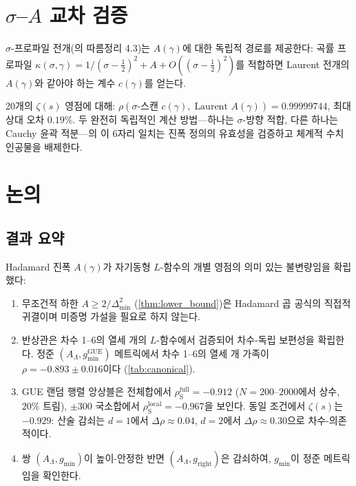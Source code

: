 \documentclass[11pt,a4paper]{article}
\theoremstyle{plain}
\theoremstyle{definition}
\DeclareMathOperator{\GUE}{GUE}
\newcommand{\La}{\Lambda}
\begin{document}
\section{$\sigma$--$A$ 교차 검증}
\label{sec:crosscheck}

$\sigma$-프로파일 전개(\cite{paper2}의 따름정리 4.3)는
$A(\gamma)$에 대한 독립적 경로를 제공한다:
곡률 프로파일 $\kappa(\sigma, \gamma) = 1/(\sigma - \tfrac{1}{2})^2 + A + O((\sigma-\tfrac{1}{2})^2)$를
적합하면 Laurent 전개의 $A(\gamma)$와 같아야 하는 계수 $c(\gamma)$를 얻는다.

20개의 $\zeta(s)$ 영점에 대해:
$\rho(\text{$\sigma$-스캔 } c(\gamma),\; \text{Laurent } A(\gamma))
= 0.99999744$,
최대 상대 오차 $0.19\%$.
두 완전히 독립적인 계산 방법---하나는 $\sigma$-방향 적합,
다른 하나는 Cauchy 윤곽 적분---의 이 6자리 일치는
진폭 정의의 유효성을 검증하고 체계적 수치 인공물을 배제한다.


\section{논의}
\label{sec:discussion}

\subsection{결과 요약}

Hadamard 진폭 $A(\gamma)$가 자기동형 $L$-함수의 개별 영점의
의미 있는 불변량임을 확립했다:
\begin{enumerate}[label=(\roman*)]
  \item 무조건적 하한 $A \ge 2/\Delta_{\min}^2$
        (\cref{thm:lower_bound})은 Hadamard 곱 공식의 직접적 귀결이며
        미증명 가설을 필요로 하지 않는다.
  \item 반상관은 차수 1--6의 열세 개의 $L$-함수에서 검증되어
        차수-독립 보편성을 확립한다.
        정준 $(A_\La, g_{\min}^{\GUE})$ 메트릭에서
        차수 1--6의 열세 개 가족이 $\rho = -0.893 \pm 0.016$이다
        (\cref{tab:canonical}).
  \item GUE 랜덤 행렬 앙상블은 전체합에서
        $\rho_{\mathrm{S}}^{\text{full}} = -0.912$
        ($N = 200$--$2000$에서 상수, $20\%$ 트림),
        $\pm 300$ 국소합에서 $\rho_{\mathrm{S}}^{\text{local}} = -0.967$을 보인다.
        동일 조건에서 $\zeta(s)$는 $-0.929$:
        산술 감쇠는 $d = 1$에서 $\Delta\rho \approx 0.04$,
        $d = 2$에서 $\Delta\rho \approx 0.30$으로 차수-의존적이다.
  \item 쌍 $(A_\La, g_{\min})$이 높이-안정한 반면
        $(A_\La, g_{\mathrm{right}})$은 감쇠하여,
        $g_{\min}$이 정준 메트릭임을 확인한다.
\end{enumerate}
\end{document}
